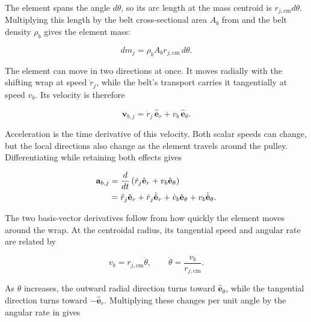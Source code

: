 \documentclass[11pt]{report}
\numberwithin{equation}{section}
\begin{document}
The element spans the angle \(d\theta\), so its arc length at the mass
centroid is \(r_{j,\mathrm{cm}}d\theta\). Multiplying this length by the belt
cross-sectional area \(A_b\) from
 and the belt density \(\rho_b\) gives
the element mass:

\begin{equation}
    dm_j
    =
    \rho_b A_b r_{j,\mathrm{cm}}\,d\theta.
    \label{eq:wrap_element_mass}
\end{equation}

The element can move in two directions at once. It moves radially with the
shifting wrap at speed \(\dot r_j\), while the belt's transport carries it
tangentially at speed \(v_b\). Its velocity is therefore

\begin{equation}
    \mathbf v_{b,j}
    =
    \dot r_j\,\hat{\mathbf e}_r
    +
    v_b\,\hat{\mathbf e}_\theta.
    \label{eq:wrap_element_velocity}
\end{equation}

Acceleration is the time derivative of this velocity. Both scalar speeds can
change, but the local directions also change as the element travels around the
pulley. Differentiating while retaining both effects gives

\begin{align}
    \mathbf a_{b,j}
    &=
    \frac{d}{dt}
    \left(
        \dot r_j\hat{\mathbf e}_r
        +
        v_b\hat{\mathbf e}_\theta
    \right)
    \notag\\
    &=
    \ddot r_j\hat{\mathbf e}_r
    +
    \dot r_j\dot{\hat{\mathbf e}}_r
    +
    \dot v_b\hat{\mathbf e}_\theta
    +
    v_b\dot{\hat{\mathbf e}}_\theta.
    \label{eq:wrap_element_acceleration_unresolved}
\end{align}

The two basis-vector derivatives follow from how quickly the element moves
around the wrap. At the centroidal radius, its tangential speed and angular
rate are related by

\begin{equation}
    v_b
    =
    r_{j,\mathrm{cm}}\dot\theta,
    \qquad
    \dot\theta
    =
    \frac{v_b}{r_{j,\mathrm{cm}}}.
    \label{eq:wrap_element_angular_rate}
\end{equation}

As \(\theta\) increases, the outward radial direction turns toward
\(\hat{\mathbf e}_\theta\), while the tangential direction turns toward
\(-\hat{\mathbf e}_r\). Multiplying these changes per unit angle by the
angular rate in  gives
\end{document}
